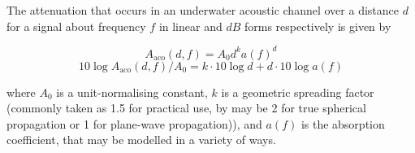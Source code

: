 The attenuation that occurs in an underwater acoustic channel over a distance $d$ for a signal about frequency $f$ in linear and $dB$ forms respectively is given by

\begin{equation}
  \label{eq:acoattenuation}
  A_{\text{aco}}(d,f) = A_0d^ka(f)^d
\end{equation}
\begin{equation}
  \label{eq:acoattenuationdb}
  10 \log A_{\text{aco}}(d,f)/A_0 = k \cdot 10 \log d + d \cdot 10 \log a(f)
\end{equation}

where $A_0$ is a unit-normalising constant, $k$ is a geometric spreading factor (commonly taken as 1.5 for practical use, by may be 2 for true spherical propagation or 1 for plane-wave propagation)), and $a(f)$ is the absorption coefficient, that may be modelled in a variety of ways.

